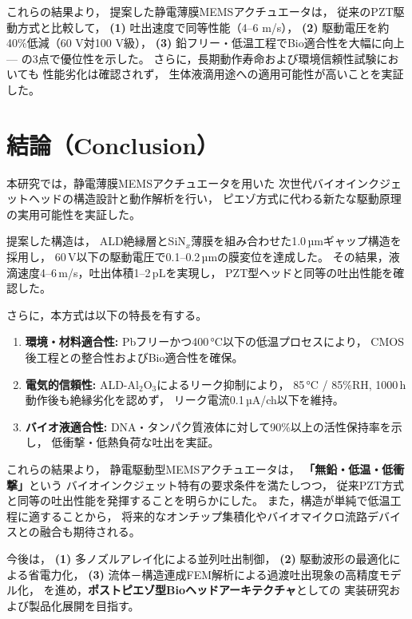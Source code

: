 \documentclass[conference]{IEEEtran}
\begin{document}
これらの結果より，
提案した静電薄膜MEMSアクチュエータは，
従来のPZT駆動方式と比較して，
\textbf{(1)} 吐出速度で同等性能（4--6 m/s），  
\textbf{(2)} 駆動電圧を約40\%低減（60 V対100 V級），  
\textbf{(3)} 鉛フリー・低温工程でBio適合性を大幅に向上—  
の3点で優位性を示した。
さらに，長期動作寿命および環境信頼性試験においても
性能劣化は確認されず，
生体液滴用途への適用可能性が高いことを実証した。

\section{結論（Conclusion）}
本研究では，静電薄膜MEMSアクチュエータを用いた
次世代バイオインクジェットヘッドの構造設計と動作解析を行い，
ピエゾ方式に代わる新たな駆動原理の実用可能性を実証した。

提案した構造は，
ALD絶縁層とSiN$_x$薄膜を組み合わせた1.0\,µmギャップ構造を採用し，
60\,V以下の駆動電圧で0.1--0.2\,µmの膜変位を達成した。
その結果，液滴速度4--6\,m/s，吐出体積1--2\,pLを実現し，
PZT型ヘッドと同等の吐出性能を確認した。

さらに，本方式は以下の特長を有する。
\begin{enumerate}
  \item \textbf{環境・材料適合性:}  
        Pbフリーかつ400\,°C以下の低温プロセスにより，
        CMOS後工程との整合性およびBio適合性を確保。
  \item \textbf{電気的信頼性:}  
        ALD-Al$_2$O$_3$によるリーク抑制により，
        85\,°C / 85\%RH, 1000\,h動作後も絶縁劣化を認めず，
        リーク電流0.1\,µA/ch以下を維持。
  \item \textbf{バイオ液適合性:}  
        DNA・タンパク質液体に対して90\%以上の活性保持率を示し，
        低衝撃・低熱負荷な吐出を実証。
\end{enumerate}

これらの結果より，
静電駆動型MEMSアクチュエータは，
\textbf{「無鉛・低温・低衝撃」}という
バイオインクジェット特有の要求条件を満たしつつ，
従来PZT方式と同等の吐出性能を発揮することを明らかにした。
また，構造が単純で低温工程に適することから，
将来的なオンチップ集積化やバイオマイクロ流路デバイスとの融合も期待される。

今後は，
\textbf{(1)} 多ノズルアレイ化による並列吐出制御，  
\textbf{(2)} 駆動波形の最適化による省電力化，  
\textbf{(3)} 流体－構造連成FEM解析による過渡吐出現象の高精度モデル化，  
を進め，\textbf{ポストピエゾ型Bioヘッドアーキテクチャ}としての
実装研究および製品化展開を目指す。
\end{document}
